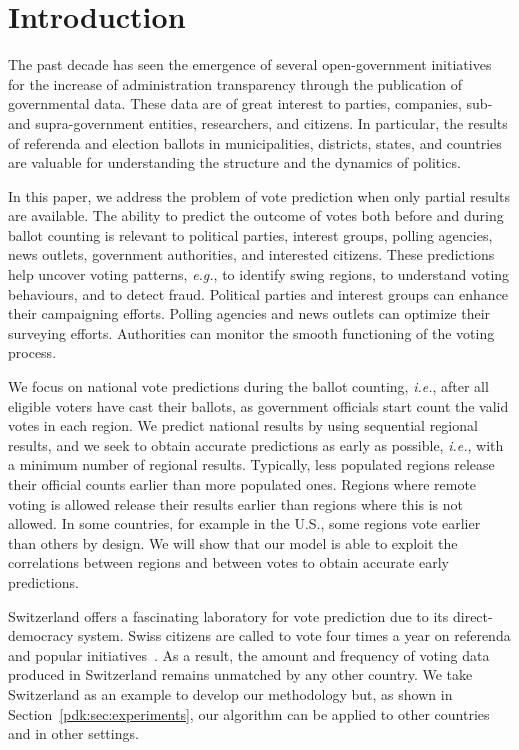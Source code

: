 \section{Introduction}%
\label{pdk:sec:introduction}

The past decade has seen the emergence of several open-government initiatives for the increase of administration transparency through the publication of governmental data.
These data are of great interest to parties, companies, sub- and supra-government entities, researchers, and citizens.
In particular, the results of referenda and election ballots in municipalities, districts, states, and countries are valuable for understanding the structure and the dynamics of politics.

In this paper, we address the problem of vote prediction when only partial results are available.
The ability to predict the outcome of votes both before and during ballot counting is relevant to political parties, interest groups, polling agencies, news outlets, government authorities, and interested citizens.
These predictions help uncover voting patterns, \textit{e.g.}, to identify swing regions, to understand voting behaviours, and to detect fraud.
Political parties and interest groups can enhance their campaigning efforts.
Polling agencies and news outlets can optimize their surveying efforts.
Authorities can monitor the smooth functioning of the voting process.

We focus on national vote predictions during the ballot counting, \textit{i.e.}, after all eligible voters have cast their ballots, as government officials start count the valid votes in each region.
We predict national results by using sequential regional results, and we seek to obtain accurate predictions as early as possible, \textit{i.e.}, with a minimum number of regional results.
Typically, less populated regions release their official counts earlier than more populated ones.
Regions where remote voting is allowed release their results earlier than regions where this is not allowed.
In some countries, for example in the U.S., some regions vote earlier than others by design.
We will show that our model is able to exploit the correlations between regions and between votes to obtain accurate early predictions.

Switzerland offers a fascinating laboratory for vote prediction due to its direct-democracy system.
Swiss citizens are called to vote four times a year on referenda and popular initiatives~\citep{confederation2019democracy, confederation2019popular}.
As a result, the amount and frequency of voting data produced in Switzerland remains unmatched by any other country.
We take Switzerland as an example to develop our methodology but, as shown in Section~\ref{pdk:sec:experiments}, our algorithm can be applied to other countries and in other settings.

